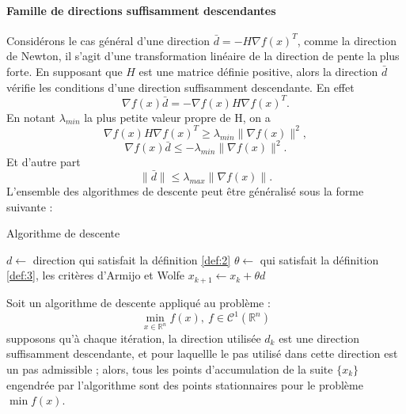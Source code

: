 \paragraph{Famille de directions suffisamment descendantes}
Consid\'erons le cas g\'en\'eral d'une direction $\bar{d}=-H\nabla f(x)^T$, comme la direction de Newton, il s'agit d'une
transformation lin\'eaire de la direction de pente la plus forte. En supposant que $H$ est
une matrice d\'efinie positive, alors la direction $\bar{d}$ v\'erifie les conditions d'une direction suffisamment
descendante. En effet
$$\nabla f(x)\bar{d}=-\nabla f(x)H\nabla f(x)^T.$$
En notant $\lambda_{min}$ la plus petite valeur propre de H, on a
$$\nabla f(x)H\nabla f(x)^T \geq \lambda_{min} \lVert \nabla f(x)\rVert^2,$$
$$\nabla f(x)\bar{d}\leq -\lambda_{min}\lVert \nabla f(x)\rVert^2.$$
Et d'autre part $$\lVert \bar{d}\rVert \leq \lambda_{max}\lVert \nabla f(x)\rVert.$$
L'ensemble des algorithmes de descente peut être g\'en\'eralis\'e sous la forme suivante : %
\begin{algorithm}                     %
\caption{Algorithme de descente}          %
\label{alg:1}                           %
\begin{algorithmic}
\STATE $d \leftarrow$  direction qui satisfait la d\'efinition \ref{def:2}
\STATE $\theta \leftarrow$  qui satisfait la d\'efinition \ref{def:3}, les crit\`eres d'Armijo et Wolfe
\STATE $x_{k+1} \leftarrow x_k+\theta d$
\ENDWHILE
\end{algorithmic}
\end{algorithm}


\begin{frtheoreme}
Soit un algorithme de descente appliqu\'e au probl\`eme :\\
$$\min_{x\in \mathbb{R}^n} f(x), \ f \in \mathcal{C}^1(\mathbb{R}^n)$$
supposons qu'\`a chaque it\'eration, la direction utilis\'ee $d_k$ est une direction suffisamment descendante,
 et pour laquellle le pas utilis\'e dans cette direction est un pas admissible ; alors, tous les points
d’accumulation de la suite $\{x_k\}$ engendr\'ee par l'algorithme sont des points stationnaires pour le
probl\`eme $\min f(x)$.
\end{frtheoreme}




